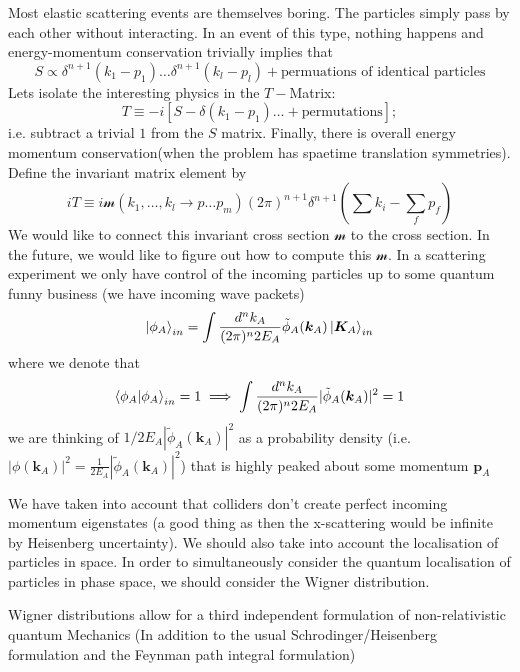 Most elastic scattering events are themselves boring. The particles simply pass by each other without interacting. In an event of this type, nothing happens and energy-momentum conservation trivially implies that
$$S \propto \delta^{n+1} (k_1 - p_1)  \dots \delta^{n+1} (k_l - p_l)+ \text{permuations of identical particles}$$ Lets isolate the interesting physics in the $T-$Matrix:
$$T \equiv -i [S - \delta(k_1 - p_1) \dots + \text{permutations}];$$ i.e. subtract a trivial $1$ from the $S$ matrix. Finally, there is overall energy momentum conservation(when the problem has spaetime translation symmetries). Define the invariant matrix element by $$iT \equiv i\mathcal{m} (k_1, \dots, k_l \to p \dots p_m) (2\pi)^{n+1} \delta^{n+1}(\sum k_i - \sum_f p_f) $$
We would like to connect this invariant cross section $\mathcal{m}$ to the cross section. In the future, we would like to figure out how to compute this $\mathcal{m}$.
In a scattering experiment we only have control of the incoming particles up to some quantum funny business (we have incoming wave packets)
$$\ket{\phi_A}_{in} = \int \frac{d^n k_A}{(2\pi)^n 2E_A} \tilde{\phi}_{A} (\bm{k}_A) \ket{\bm{K}_A}_{in}$$ where we denote that
\begin{equation}
    \expval{\phi_A | \phi_A}_{in} = 1 \implies \int \frac{d^n k_A}{(2\pi)^n 2E_A} |\tilde{\phi}_{A} (\bm{k}_A) |^2 = 1
\end{equation}
we are thinking of $1/2E_A |\tilde{\phi}_A (\bm{k}_A)|^2$ as a probability density (i.e. $|\phi (\bm{k}_{A})|^2 = \frac{1}{2E_A} |\tilde{\phi}_A (\bm{k}_{A})|^2$) that is highly peaked about some momentum $\bm{p}_A$

We have taken into account that colliders don't create perfect incoming momentum eigenstates (a good thing as then the x-scattering would be infinite by Heisenberg uncertainty). We should also take into account the localisation of particles in space. In order to simultaneously consider the quantum localisation of particles in phase space, we should consider the Wigner distribution. 

Wigner distributions allow for a third independent formulation of non-relativistic quantum Mechanics (In addition to the usual Schrodinger/Heisenberg formulation and the Feynman path integral formulation)

